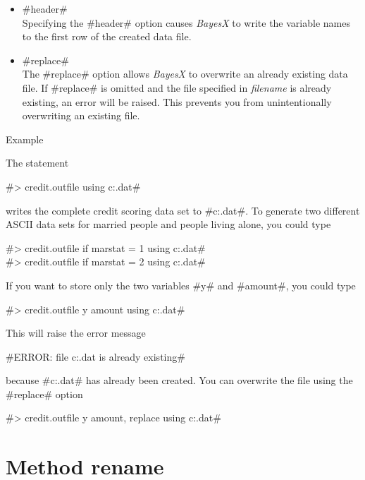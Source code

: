 

\begin{itemize}
\item #header# \\
Specifying the #header# option causes {\em BayesX} to write the
variable names to the first row of the created data file.
\item #replace# \\
The #replace# option allows {\em BayesX} to overwrite an already
existing data file. If #replace# is omitted and the file specified
in {\em filename} is already existing, an error will be raised.
This prevents you from unintentionally overwriting an existing
file.
\end{itemize}


\begin{stanza}{Example}

The statement

#> credit.outfile using c:\data\cr.dat#

writes the complete credit scoring data set to
#c:\data\cr.dat#. To generate two different
ASCII
data sets for married people and people living alone, you could type

#> credit.outfile if marstat = 1 using c:\data\crmarried.dat# \\
#> credit.outfile if marstat = 2 using c:\data\cralone.dat#

If you want to store only the two variables #y# and #amount#, you
could type

#> credit.outfile y amount using c:\data\cr.dat#

This will raise the error message

#ERROR: file c:\data\cr.dat is already existing#

because #c:\data\cr.dat# has already been created. You can
overwrite the file using the #replace# option

#> credit.outfile y amount, replace using c:\data\cr.dat#
\end{stanza}



\clearpage




\section{Method rename}
 


\label{rename}


